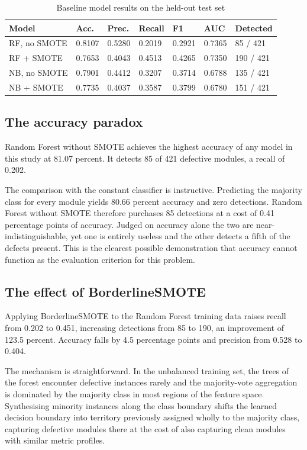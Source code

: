 \documentclass[12pt,a4paper,oneside]{report}
\newcommand{\tabfont}{\fontsize{11}{13}\selectfont\setlength{\tabcolsep}{4pt}}
\begin{document}
\begin{table}[H]
\centering
\caption{Baseline model results on the held-out test set}
\label{tab:baseline}
\tabfont
\begin{tabular}{L{32mm}C{14mm}C{14mm}C{14mm}C{14mm}C{14mm}C{18mm}}
\toprule
\textbf{Model} & \textbf{Acc.} & \textbf{Prec.} & \textbf{Recall} & \textbf{F1} & \textbf{AUC} & \textbf{Detected} \\
\midrule
RF, no SMOTE  & 0.8107 & 0.5280 & 0.2019 & 0.2921 & 0.7365 & 85 / 421 \\
RF + SMOTE    & 0.7653 & 0.4043 & 0.4513 & 0.4265 & 0.7350 & 190 / 421 \\
NB, no SMOTE  & 0.7901 & 0.4412 & 0.3207 & 0.3714 & 0.6788 & 135 / 421 \\
NB + SMOTE    & 0.7735 & 0.4037 & 0.3587 & 0.3799 & 0.6780 & 151 / 421 \\
\bottomrule
\end{tabular}
\end{table}

\subsection{The accuracy paradox}

Random Forest without SMOTE achieves the highest accuracy of any model in this study at 81.07 percent. It detects 85 of 421 defective modules, a recall of 0.202.

The comparison with the constant classifier is instructive. Predicting the majority class for every module yields 80.66 percent accuracy and zero detections. Random Forest without SMOTE therefore purchases 85 detections at a cost of 0.41 percentage points of accuracy. Judged on accuracy alone the two are near-indistinguishable, yet one is entirely useless and the other detects a fifth of the defects present. This is the clearest possible demonstration that accuracy cannot function as the evaluation criterion for this problem.

\subsection{The effect of BorderlineSMOTE}

Applying BorderlineSMOTE to the Random Forest training data raises recall from 0.202 to 0.451, increasing detections from 85 to 190, an improvement of 123.5 percent. Accuracy falls by 4.5 percentage points and precision from 0.528 to 0.404.

The mechanism is straightforward. In the unbalanced training set, the trees of the forest encounter defective instances rarely and the majority-vote aggregation is dominated by the majority class in most regions of the feature space. Synthesising minority instances along the class boundary shifts the learned decision boundary into territory previously assigned wholly to the majority class, capturing defective modules there at the cost of also capturing clean modules with similar metric profiles.
\end{document}
